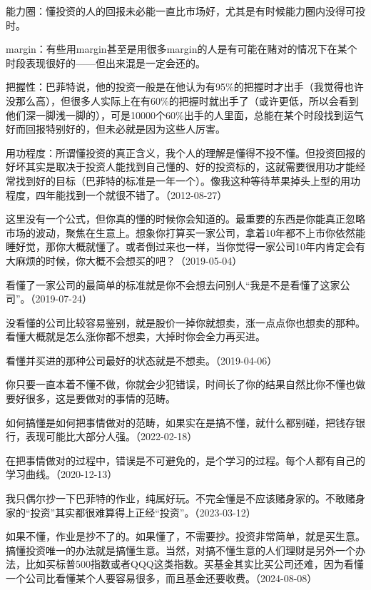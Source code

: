 能力圈：懂投资的人的回报未必能一直比市场好，尤其是有时候能力圈内没得可投时。

margin：有些用margin甚至是用很多margin的人是有可能在赌对的情况下在某个时段表现很好的——但出来混是一定会还的。

把握性：巴菲特说，他的投资一般是在他认为有95\%的把握时才出手（我觉得也许没那么高），但很多人实际上在有60\%的把握时就出手了（或许更低，所以会看到他们深一脚浅一脚的），可是10000个60\%出手的人里面，总能在某个时段找到运气好而回报特别好的，但未必就是因为这些人厉害。

用功程度：所谓懂投资的真正含义，我个人的理解是懂得不投不懂。但投资回报的好坏其实是取决于投资人能找到自己懂的、好的投资标的，这就需要很用功才能经常找到好的目标（巴菲特的标准是一年一个）。像我这种等待苹果掉头上型的用功程度，四年能找到一个就很不错了。（2012-08-27）


这里没有一个公式，但你真的懂的时候你会知道的。最重要的东西是你能真正忽略市场的波动，聚焦在生意上。想象你打算买一家公司，拿着10年都不上市你依然能睡好觉，那你大概就懂了。或者倒过来也一样，当你觉得一家公司10年内肯定会有大麻烦的时候，你大概不会想买的吧？（2019-05-04）

看懂了一家公司的最简单的标准就是你不会想去问别人“我是不是看懂了这家公司”。（2019-07-24）

没看懂的公司比较容易鉴别，就是股价一掉你就想卖，涨一点点你也想卖的那种。看懂大概就是怎么涨你都不想卖，大掉时你会全力再买进。

看懂并买进的那种公司最好的状态就是不想卖。（2019-04-06）

你只要一直本着不懂不做，你就会少犯错误，时间长了你的结果自然比你不懂也做要好很多，这是要做对的事情的范畴。

如何搞懂是如何把事情做对的范畴，如果实在是搞不懂，就什么都别碰，把钱存银行，表现可能比大部分人强。（2022-02-18）

在把事情做对的过程中，错误是不可避免的，是个学习的过程。每个人都有自己的学习曲线。（2020-12-13）


我只偶尔抄一下巴菲特的作业，纯属好玩。不完全懂是不应该赌身家的。不敢赌身家的“投资”其实都很难算得上正经“投资”。（2023-03-12）

如果不懂，作业是抄不了的。如果懂了，不需要抄。投资非常简单，就是买生意。搞懂投资唯一的办法就是搞懂生意。当然，对搞不懂生意的人们理财是另外一个办法，比如买标普500指数或者QQQ这类指数。买基金其实比买公司还难，因为看懂一个公司比看懂某个人要容易很多，而且基金还要收费。（2024-08-08）

